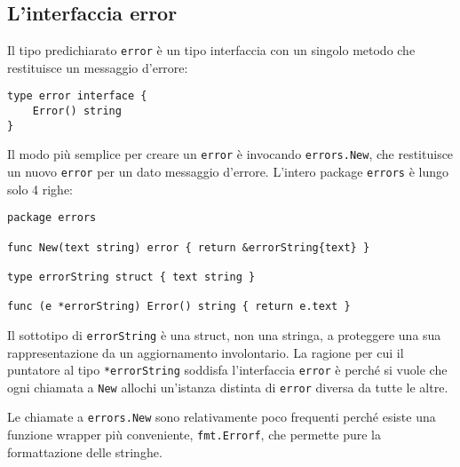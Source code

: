 \documentclass[../../thesis.tex]{subfiles}
\begin{document}
    \subsection{L'interfaccia error}\label{subsec:l'interfaccia-error}
    Il tipo predichiarato \verb"error" è un tipo interfaccia con un singolo metodo che restituisce un messaggio d'errore:
    \begin{lstlisting}[frame = single, label = {lst:lstlisting6-6.1}]
type error interface {
    Error() string
}
    \end{lstlisting}
    Il modo più semplice per creare un \verb"error" è invocando \verb"errors.New", che restituisce un nuovo \verb"error" per un dato messaggio d'errore.
    \clearpage
    \newpage
    L'intero package \verb"errors" è lungo solo 4 righe:
    \begin{lstlisting}[frame = single, label = {lst:lstlisting6-6.2}]
package errors

func New(text string) error { return &errorString{text} }

type errorString struct { text string }

func (e *errorString) Error() string { return e.text }
    \end{lstlisting}
    Il sottotipo di \verb"errorString" è una struct, non una stringa, a proteggere una sua rappresentazione da un aggiornamento involontario.
    La ragione per cui il puntatore al tipo \verb"*errorString" soddisfa l'interfaccia \verb"error" è perché si vuole che ogni chiamata a \verb"New" allochi un'istanza distinta di \verb"error" diversa da tutte le altre.
    \hfill \vspace{12pt}

    Le chiamate a \verb"errors.New" sono relativamente poco frequenti perché esiste una funzione wrapper più conveniente, \verb"fmt.Errorf", che permette pure la formattazione delle stringhe.
\end{document}
